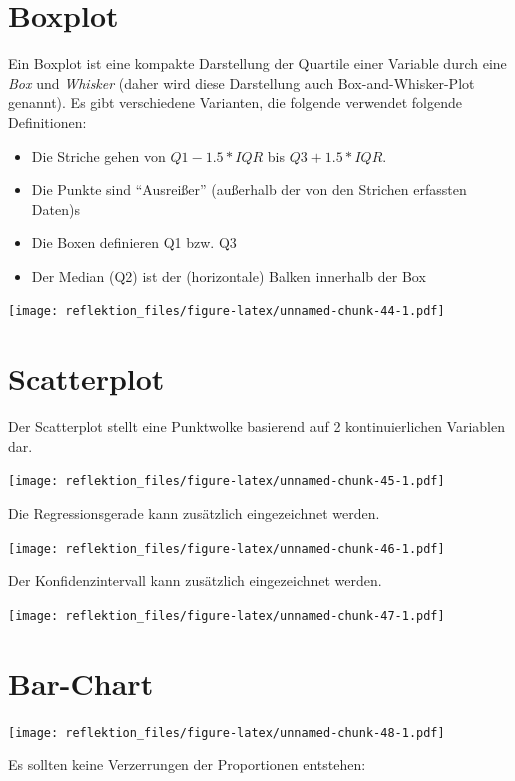 \documentclass[
]{book}
\providecommand{\tightlist}{%
  \setlength{\itemsep}{0pt}\setlength{\parskip}{0pt}}
\begin{document}
\hypertarget{boxplot}{%
\section{Boxplot}\label{boxplot}}

Ein Boxplot ist eine kompakte Darstellung der Quartile einer Variable durch eine \emph{Box} und \emph{Whisker} (daher wird diese Darstellung auch Box-and-Whisker-Plot genannt). Es gibt verschiedene Varianten, die folgende verwendet folgende Definitionen:

\begin{itemize}
\tightlist
\item
  Die Striche gehen von \(Q1 - 1.5*IQR\) bis \(Q3 + 1.5*IQR\).
\item
  Die Punkte sind ``Ausreißer'' (außerhalb der von den Strichen erfassten Daten)s
\item
  Die Boxen definieren Q1 bzw. Q3
\item
  Der Median (Q2) ist der (horizontale) Balken innerhalb der Box
\end{itemize}

\texttt{[image: reflektion\_files/figure-latex/unnamed-chunk-44-1.pdf]}

\hypertarget{scatterplot}{%
\section{Scatterplot}\label{scatterplot}}

Der Scatterplot stellt eine Punktwolke basierend auf 2 kontinuierlichen Variablen dar.

\texttt{[image: reflektion\_files/figure-latex/unnamed-chunk-45-1.pdf]}

Die Regressionsgerade kann zusätzlich eingezeichnet werden.

\texttt{[image: reflektion\_files/figure-latex/unnamed-chunk-46-1.pdf]}

Der Konfidenzintervall kann zusätzlich eingezeichnet werden.

\texttt{[image: reflektion\_files/figure-latex/unnamed-chunk-47-1.pdf]}

\hypertarget{bar-chart}{%
\section{Bar-Chart}\label{bar-chart}}

\texttt{[image: reflektion\_files/figure-latex/unnamed-chunk-48-1.pdf]}

Es sollten keine Verzerrungen der Proportionen entstehen:
\end{document}
